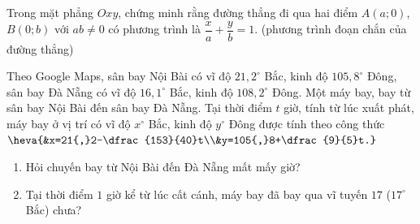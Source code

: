 \begin{bt}%
	Trong mặt phẳng $Oxy$, chứng minh rằng đường thẳng đi qua hai điểm $A(a;0)$, $B(0;b)$ với $ab\ne 0$ có phương trình là $\dfrac{x}{a}+\dfrac{y}{b}=1$. (phương trình đoạn chắn của đường thẳng)
\end{bt}

\begin{bt}%
	Theo Google Maps, sân bay Nội Bài có vĩ độ $21{,}2^\circ$ Bắc, kinh độ $105{,}8^\circ$ Đông, sân bay Đà Nẵng có vĩ độ $16{,}1^\circ$ Bắc, kinh độ $108{,}2^\circ$ Đông. Một máy bay, bay từ sân bay Nội Bài đến sân bay Đà Nẵng. Tại thời điểm $t$ giờ, tính từ lúc xuất phát, máy bay ở vị trí có vĩ độ $x^\circ$ Bắc, kinh độ $y^\circ$ Đông được tính theo công thức $\heva{&x=21{,}2-\dfrac{153}{40}t\\&y=105{,}8+\dfrac{9}{5}t.}$
	\begin{enumerate}
		\item Hỏi chuyến bay từ Nội Bài đến Đà Nẵng mất mấy giờ?
		\item Tại thời điểm $1$ giờ kể từ lúc cất cánh, máy bay đã bay qua vĩ tuyến $17$ ($17^\circ$ Bắc) chưa?
	\end{enumerate}
\end{bt}
